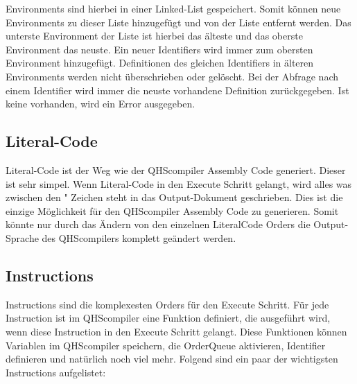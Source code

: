 Environments sind hierbei in einer Linked-List gespeichert. Somit können neue Environments zu dieser Liste hinzugefügt und von der Liste entfernt werden.
Das unterste Environment der Liste ist hierbei das älteste und das oberste Environment das neuste.
Ein neuer Identifiers wird immer zum obersten Environment hinzugefügt. Definitionen des gleichen Identifiers in älteren Environments werden nicht überschrieben oder gelöscht.
Bei der Abfrage nach einem Identifier wird immer die neuste vorhandene Definition zurückgegeben. Ist keine vorhanden, wird ein Error ausgegeben.

\subsection{Literal-Code}
Literal-Code ist der Weg wie der QHScompiler Assembly Code generiert. Dieser ist sehr simpel. Wenn Literal-Code in den Execute Schritt gelangt, wird alles was zwischen den " Zeichen steht in das Output-Dokument geschrieben.
Dies ist die einzige Möglichkeit für den QHScompiler Assembly Code zu generieren. Somit könnte nur durch das Ändern von den einzelnen LiteralCode Orders die Output-Sprache des QHScompilers komplett geändert werden.

\subsection{Instructions}
Instructions sind die komplexesten Orders für den Execute Schritt. Für jede Instruction ist im QHScompiler eine Funktion definiert, die ausgeführt wird, wenn diese Instruction in den Execute Schritt gelangt.
Diese Funktionen können Variablen im QHScompiler speichern, die OrderQueue aktivieren, Identifier definieren und natürlich noch viel mehr. Folgend sind ein paar der wichtigsten Instructions aufgelistet:

